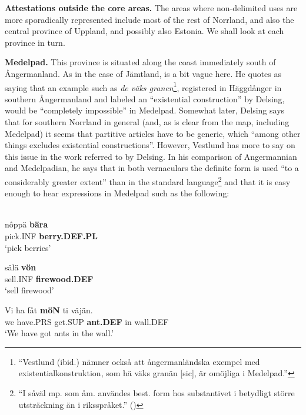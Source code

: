 \z

\textbf{Attestations outside the core areas.} The areas where non-delimited uses are more sporadically represented include most of the rest of Norrland, and also the central province of Uppland, and possibly also Estonia. We shall look at each province in turn.

\textbf{Medelpad.} This province is situated along the coast immediately south of Ångermanland. As in the case of Jämtland, \citet[19]{Delsing2003a} is a bit vague here. He quotes \citet[21]{Vestlund1923} as saying that an example such as \textit{de väks granen}\footnote{ “Vestlund (ibid.) nämner också att ångermanländska exempel med existentialkonstruktion, som hä väks granän [sic], är omöjliga i Medelpad.”}, registered in Häggdånger in southern Ångermanland and labeled an “existential construction” by Delsing, would be “completely impossible” in Medelpad. Somewhat later, Delsing says that for southern Norrland in general (and, as is clear from the map, including Medelpad) it seems that partitive articles have to be generic, which “among other things excludes existential constructions”. However, Vestlund has more to say on this issue in the work referred to by Delsing. In his comparison of Angermannian and Medelpadian, he says that in both vernaculars the definite form is used “to a considerably greater extent” than in the standard language\footnote{ “I såväl mp. som åm. användes best. form hos substantivet i betydligt större utsträckning än i riksspråket.” (\citet[20]{Vestlund1923})} and that it is easy enough to hear expressions in Medelpad such as the following:


\ea\label{}
\\
\gll nôppä  \textbf{bära}\\
pick.INF  \textbf{berry.DEF.PL}\\
\glt ‘pick berries’

\z

\ea
\gll sälä  \textbf{vön} \\
sell.INF  \textbf{firewood.DEF} \\
\glt ‘sell firewood’

\z

\ea
\gll Vi  ha  fåt  \textbf{möN} ti  väjän.  \\
we  have.PRS  get.SUP  \textbf{ant.DEF} in  wall.DEF  \\
\glt ‘We have got ants in the wall.’


